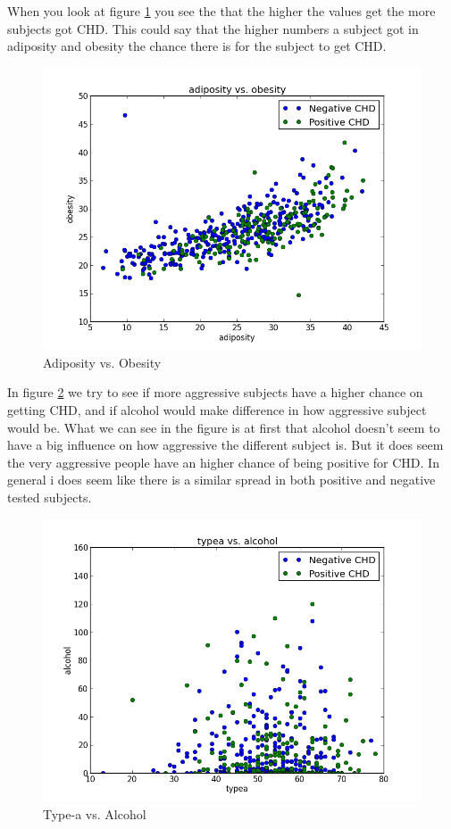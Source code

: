 When you look at figure \ref{ObeAsi} you see the that the higher the values get the more subjects got CHD. This could say that the higher numbers a subject got in adiposity and obesity the chance there is for the subject to get CHD.

\begin{figure}[H]
\centering
\includegraphics[width=12cm, keepaspectratio=true]{pictures/adiposityObesity.png}
\caption{\footnotesize Adiposity vs. Obesity}
\label{ObeAsi}
\end{figure}

In figure \ref{typeAlco} we try to see if more aggressive subjects have a higher chance on getting CHD, and if alcohol would make difference in how aggressive subject would be. What we can see in the figure is at first that alcohol doesn't seem to have a big influence on how aggressive the different subject is. But it does seem the very aggressive people have an higher chance of being positive for CHD. In general i does seem like there is a similar spread in both positive and negative tested subjects.

\begin{figure}[H]
\centering
\includegraphics[width=12cm, keepaspectratio=true]{pictures/typeaalcohol.png}
\caption{\footnotesize Type-a vs. Alcohol}
\label{typeAlco}
\end{figure}